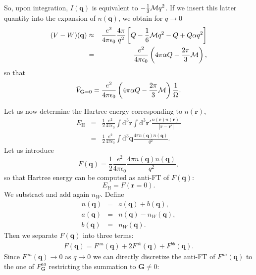 \documentclass[a4paper,twocolumn,12pt]{article}
\begin{document}
%
So, upon integration, $I(\mathbf{q})$ is equivalent to
$-\frac{1}{3}{\cal{M}}q^2$.  If we insert this latter quantity into the
expansion of $n(\mathbf{q})$, we obtain for ${q\rightarrow0}$
\begin{eqnarray}
(V-W)(\mathbf{q})&\approx&
\frac{e^2}{4\pi\epsilon_0}\frac{4\pi}{q^2} \left[ Q - \frac{1}{6}{\cal{M}}q^2 - Q +Q\alpha q^2\right]\nonumber\\
&=&\frac{e^2}{4\pi\epsilon_0} \left(4\pi\alpha Q - \frac{2\pi}{3}{\cal{M}}\right),
\end{eqnarray}
so that
\begin{equation}
\bar{V}_{\mathbf{G}=0}=\frac{e^2}{4\pi\epsilon_0} \left(4\pi\alpha Q - \frac{2\pi}{3}{\cal{M}}\right)\frac{1}{\Omega}.
\end{equation}

Let us now determine the Hartree energy corresponding to
$n(\mathbf{r})$,
\begin{eqnarray}
E_\text{H} &=& \frac{1}{2} \frac{e^2}{4\pi\epsilon_0} \int\mathrm{d}^3\mathbf{r}\int\mathrm{d}^3\mathbf{r}' \frac{n(\mathbf{r})n(\mathbf{r})'}{|\mathbf{r}-\mathbf{r}'|}\nonumber\\
&=& \frac{1}{2} \frac{e^2}{4\pi\epsilon_0} \int\mathrm{d}^3\mathbf{q} \frac{4\pi n(\mathbf{q})n(\mathbf{q})}{q^2}.
\end{eqnarray}
Let us introduce
\begin{equation}
F(\mathbf{q})=\frac{1}{2}\frac{e^2}{4\pi\epsilon_0}\frac{4\pi
n(\mathbf{q})n(\mathbf{q})}{q^2},
\end{equation}
so that Hartree energy can be computed as anti-FT of $F(\mathbf{q})$:
\begin{equation}
E_\text{H}=F(\mathbf{r}=0).
\end{equation}
We substract and add again $n_W$.  Define
\begin{eqnarray}
n(\mathbf{q})&=&a(\mathbf{q})+b(\mathbf{q}),\\
a(\mathbf{q})&=&n(\mathbf{q})-n_W(\mathbf{q}),\\
b(\mathbf{q})&=&n_W(\mathbf{q}).
\end{eqnarray}
Then we separate $F(\mathbf{q})$ into three terms:
\begin{eqnarray}
F(\mathbf{q})=F^{aa}(\mathbf{q})+2F^{ab}(\mathbf{q})+F^{bb}(\mathbf{q}).
\end{eqnarray}
Since $F^{aa}(\mathbf{q})\rightarrow0$ as $q\rightarrow0$ we can
directly discretize the anti-FT of $F^{aa}(\mathbf{q})$ to the one of
$F^{aa}_\mathbf{G}$ restricting the summation to $\mathbf{G}\neq0$:
\end{document}
